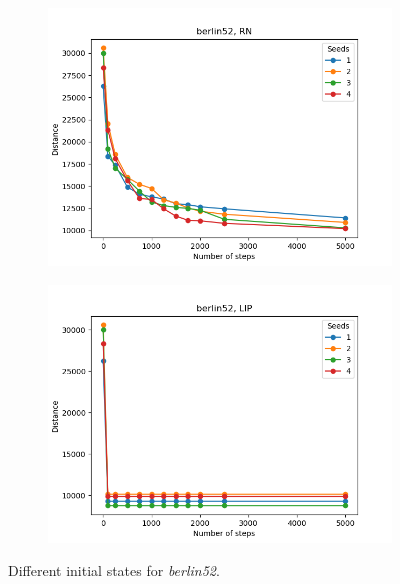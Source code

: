 \begin{figure}[!htb]
	\centering
	\begin{subfigure}{0.45\textwidth}
		\includegraphics[width=\textwidth]{img/berlin52_seeds_locally=False}
	\end{subfigure}
	\begin{subfigure}{0.45\textwidth}
		\includegraphics[width=\textwidth]{img/berlin52_seeds_locally=True}
	\end{subfigure}
	\caption{Different initial states for \textit{berlin52}.}
\end{figure}
